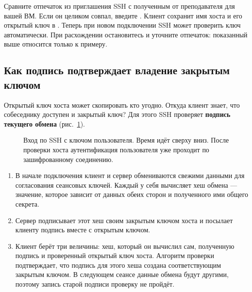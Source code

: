 Сравните отпечаток из приглашения SSH с полученным от преподавателя
для вашей ВМ. Если он целиком совпал, введите . Клиент сохранит
имя хоста и его открытый ключ в . Теперь при
новом подключении SSH может проверить ключ автоматически. При расхождении
остановитесь и уточните отпечаток: показанный выше относится только
к примеру.

\subsection{Как подпись подтверждает владение закрытым ключом}

Открытый ключ хоста может скопировать кто угодно. Откуда клиент знает,
что собеседнику доступен и закрытый ключ? Для этого SSH проверяет
\textbf{подпись текущего обмена} (рис.~\ref{fig:security-ssh-keys}).

\begin{figure}[!htb]
  \centering
  \caption{Вход по SSH с ключом пользователя. Время идёт сверху вниз.
    После проверки хоста аутентификация пользователя уже проходит
    по зашифрованному соединению.}
  \label{fig:security-ssh-keys}
\end{figure}

\begin{enumerate}
  \item В начале подключения клиент и сервер обмениваются свежими
    данными для согласования сеансовых ключей. Каждый у себя вычисляет
    хеш обмена --- значение, которое зависит от данных обеих сторон
    и полученного ими общего секрета.
  \item Сервер подписывает этот хеш своим закрытым ключом хоста
    и посылает клиенту подпись вместе с открытым ключом.
  \item Клиент берёт три величины: хеш, который он вычислил сам,
    полученную подпись и проверенный открытый ключ хоста. Алгоритм
    проверки подтверждает, что подпись для этого хеша создана
    соответствующим закрытым ключом. В следующем сеансе данные обмена
    будут другими, поэтому запись старой подписи проверку не пройдёт.
\end{enumerate}

